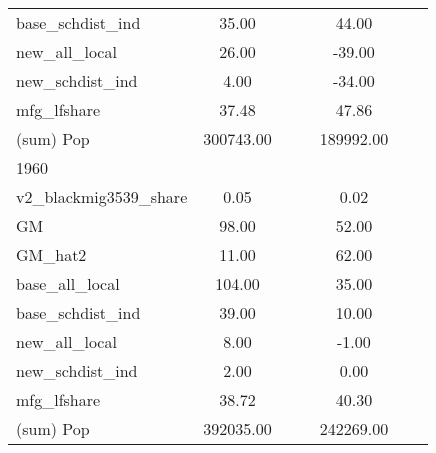 \begin{table}[htbp]
\begin{tabular}{l*{2}{ccc}}
base\_schdist\_ind    &       35.00&            &            &       44.00&            &            \\
new\_all\_local       &       26.00&            &            &      -39.00&            &            \\
new\_schdist\_ind     &        4.00&            &            &      -34.00&            &            \\
mfg\_lfshare         &       37.48&            &            &       47.86&            &            \\
(sum) Pop           &   300743.00&            &            &   189992.00&            &            \\
\midrule
1960                &            &            &            &            &            &            \\
v2\_blackmig3539\_share&        0.05&            &            &        0.02&            &            \\
GM                  &       98.00&            &            &       52.00&            &            \\
GM\_hat2             &       11.00&            &            &       62.00&            &            \\
base\_all\_local      &      104.00&            &            &       35.00&            &            \\
base\_schdist\_ind    &       39.00&            &            &       10.00&            &            \\
new\_all\_local       &        8.00&            &            &       -1.00&            &            \\
new\_schdist\_ind     &        2.00&            &            &        0.00&            &            \\
mfg\_lfshare         &       38.72&            &            &       40.30&            &            \\
(sum) Pop           &   392035.00&            &            &   242269.00&            &            \\
\bottomrule
\end{tabular}
\end{table}
